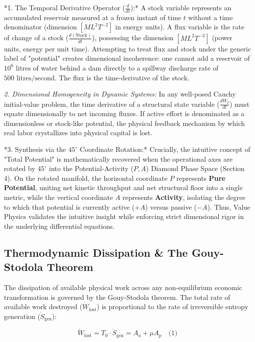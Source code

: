 \documentclass[preprint,12pt,authoryear]{elsarticle}
\theoremstyle{definition}
\begin{document}
*1. The Temporal Derivative Operator ($ \frac{d}{dt}$):* A stock variable represents an accumulated reservoir measured at a frozen instant of time $t$ without a time denominator (dimension $[M L^2 T^{-2}]$ in energy units). A flux variable is the rate of change of a stock ($ \frac{d( \text{Stock})}{dt}$), possessing the dimension $[M L^2 T^{-3}]$ (power units, energy per unit time). Attempting to treat flux and stock under the generic label of "potential" creates dimensional incoherence: one cannot add a reservoir of $10^6 \text{ litres}$ of water behind a dam directly to a spillway discharge rate of $500 \text{ litres/second}$. The flux is the time-derivative of the stock.

\textit{2. Dimensional Homogeneity in Dynamic Systems:} In any well-posed Cauchy initial-value problem, the time derivative of a structural state variable ($ \frac{dW_p}{dt}$) must equate dimensionally to net incoming fluxes. If active effort is denominated as a dimensionless or stock-like potential, the physical feedback mechanism by which real labor crystallizes into physical capital is lost.

*3. Synthesis via the $45^\circ$ Coordinate Rotation:* Crucially, the intuitive concept of "Total Potential" is mathematically recovered when the operational axes are rotated by $45^\circ$ into the Potential-Activity ($P, A$) Diamond Phase Space (Section 4). On the rotated manifold, the horizontal coordinate $P$ represents \textbf{Pure Potential}, uniting net kinetic throughput and net structural floor into a single metric, while the vertical coordinate $A$ represents \textbf{Activity}, isolating the degree to which that potential is currently active ($+A$) versus passive ($-A$). Thus, Value Physics validates the intuitive insight while enforcing strict dimensional rigor in the underlying differential equations.

\subsection{Thermodynamic Dissipation \& The Gouy-Stodola Theorem}

The dissipation of available physical work across any non-equilibrium economic transformation is governed by the Gouy-Stodola theorem. The total rate of available work destroyed ($\dot{W}_{ \text{lost}}$) is proportional to the rate of irreversible entropy generation ($\dot{S}_{ \text{gen}}$):

$$\dot{W}_{ \text{lost}} = T_0 \cdot \dot{S}_{ \text{gen}} = A_a + \mu A_p \quad \text{(1)}$$
\end{document}
